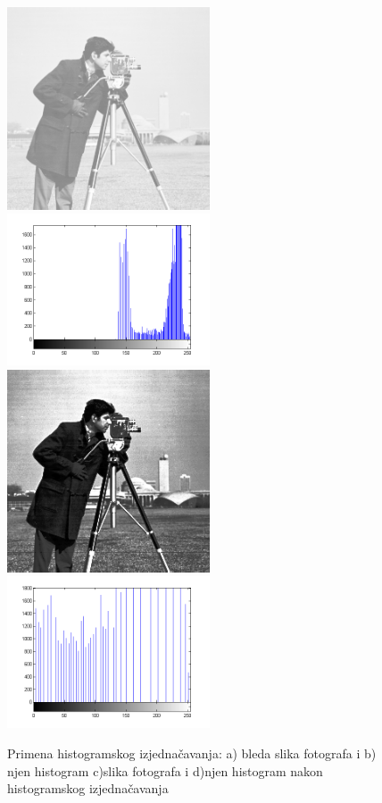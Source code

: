 \documentclass[a4paper,12pt,titlepage]{article}
\begin{document}
\begin{figure}[ht!]
\centering
\includegraphics[width=60mm]{img/imgPow2.png}
\includegraphics[width=60mm]{img/histImgPow2.png}
\includegraphics[width=60mm]{img/histEq.png}
\includegraphics[width=60mm]{img/histEqhist.png}
\caption{Primena histogramskog izjednačavanja: a) bleda slika fotografa i b) njen histogram c)slika fotografa i d)njen histogram nakon histogramskog izjednačavanja}
\label{overflow}
\end{figure}
\end{document}
